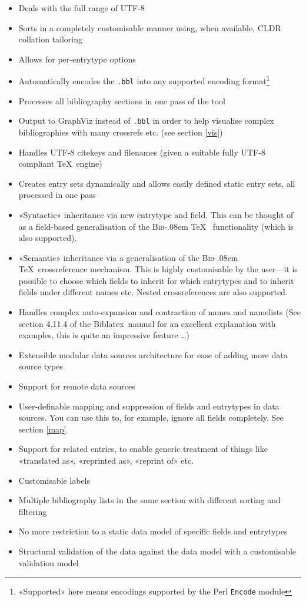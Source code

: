 \documentclass{ltxdockit}
\def\BibTeX{\textsc{Bib}\kern-.08em \TeX}
\newcommand*{\biblatex}{Biblatex\xspace}
\begin{document}
\begin{itemize}
\item Deals with the full range of UTF-8
\item Sorts in a completely customisable manner using, when available,
  CLDR collation tailoring
\item Allows for per-entrytype options
\item Automatically encodes the \verb+.bbl+ into any supported encoding
  format\footnote{«Supported» here means encodings supported by the
    Perl \texttt{Encode} module}
\item Processes all bibliography sections in one pass of the tool
\item Output to GraphViz instead of \verb+.bbl+ in order to help visualise
  complex bibliographies with many crossrefs etc. (see section \ref{vis})
\item Handles UTF-8 citekeys and filenames (given a suitable fully
  UTF-8 compliant \TeX\ engine)
\item Creates entry sets dynamically and allows easily defined static entry sets,
  all processed in one pass
\item «Syntactic» inheritance via new  entrytype and
  field. This can be thought of as a field-based generalisation of the
  \BibTeX\  functionality (which is also supported).
\item «Semantic» inheritance via a generalisation of the \BibTeX\
  crossreference mechanism. This is highly customisable by the
  user---it is possible to choose which fields to inherit for which
  entrytypes and to inherit fields under different names etc. Nested
  crossreferences are also supported.
\item Handles complex auto-expansion and contraction of names and
  namelists (See section 4.11.4 of the \biblatex\ manual for an excellent
  explanation with examples, this is quite an impressive feature \ldots)
\item Extensible modular data sources architecture for ease of adding
  more data source types
\item Support for remote data sources
\item User-definable mapping and suppression of fields and entrytypes in
  data sources. You can use this to, for example, ignore all
   fields completely. See section \ref{map}
\item Support for related entries, to enable generic treatment of things
  like «translated as», «reprinted as», «reprint of»
  etc.
\item Customisable labels
\item Multiple bibliography lists in the same section with different
  sorting and filtering
\item No more restriction to a static data model of specific fields and
  entrytypes
\item Structural validation of the data against the data model with a
  customisable validation model
\end{itemize}
\end{document}

